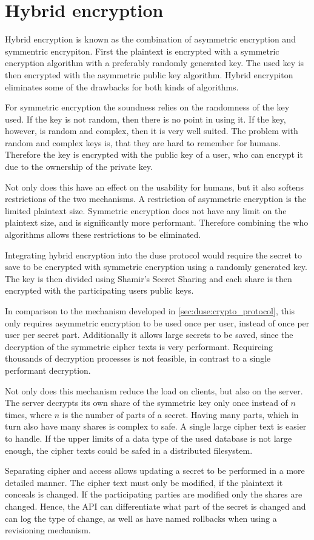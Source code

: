 \section{Hybrid encryption}

Hybrid encryption is known as the combination of asymmetric encryption and
symmentric encrypiton. First the plaintext is encrypted with a symmetric
encryption algorithm with a preferably randomly generated key. The used key is
then encrypted with the asymmetric public key algorithm. Hybrid encrypiton
eliminates some of the drawbacks for both kinds of algorithms.

For symmetric encryption the soundness relies on the randomness of the key
used. If the key is not random, then there is no point in using it. If the key,
however, is random and complex, then it is very well suited. The problem with
random and complex keys is, that they are hard to remember for humans.
Therefore the key is encrypted with the public key of a user, who can encrypt
it due to the ownership of the private key.

Not only does this have an effect on the usability for humans, but it also
softens restrictions of the two mechanisms. A restriction of asymmetric
encryption is the limited plaintext size. Symmetric encryption does not have
any limit on the plaintext size, and is significantly more performant.
Therefore combining the who algorithms allows these restrictions to be
eliminated.

Integrating hybrid encryption into the duse protocol would require the secret
to save to be encrypted with symmetric encryption using a randomly generated
key. The key is then divided using Shamir's Secret Sharing and each share is
then encrypted with the participating users public keys.

In comparison to the mechanism developed in \ref{sec:duse:crypto_protocol},
this only requires asymmetric encryption to be used once per user, instead of
once per user per secret part. Additionally it allows large secrets to be
saved, since the decryption of the symmetric cipher texts is very performant.
Requireing thousands of decryption processes is not feasible, in contrast to a
single performant decryption.

Not only does this mechanism reduce the load on clients, but also on the
server. The server decrypts its own share of the symmetric key only once
instead of $n$ times, where $n$ is the number of parts of a secret. Having many
parts, which in turn also have many shares is complex to safe. A single large
cipher text is easier to handle. If the upper limits of a data type of the used
database is not large enough, the cipher texts could be safed in a distributed
filesystem.

Separating cipher and access allows updating a secret to be performed in a more
detailed manner. The cipher text must only be modified, if the plaintext it
conceals is changed. If the participating parties are modified only the shares
are changed. Hence, the API can differentiate what part of the secret is changed
and can log the type of change, as well as have named rollbacks when using a
revisioning mechanism.

